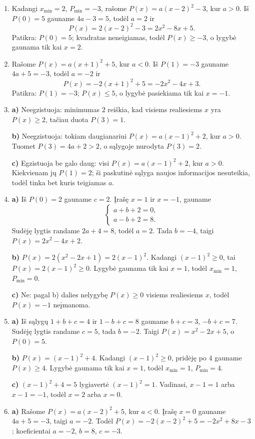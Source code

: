 \documentclass[12pt,a4paper]{article}
\begin{document}
\begin{enumerate}
\textbf{c)} Ne. Jei maksimumas yra $1$, kiekvienam $x$ turi galioti $P(x)\le1$, tačiau sąlyga $P(0)=2$ tam prieštarauja.
\item Kadangi $x_{\min}=2$, $P_{\min}=-3$, rašome $P(x)=a(x-2)^2-3$, kur $a>0$. Iš $P(0)=5$ gauname $4a-3=5$, todėl $a=2$ ir
\[
P(x)=2(x-2)^2-3=2x^2-8x+5.
\]
Patikra: $P(0)=5$; kvadratas neneigiamas, todėl $P(x)\ge-3$, o lygybė gaunama tik kai $x=2$.
\item Rašome $P(x)=a(x+1)^2+5$, kur $a<0$. Iš $P(1)=-3$ gauname $4a+5=-3$, todėl $a=-2$ ir
\[
P(x)=-2(x+1)^2+5=-2x^2-4x+3.
\]
Patikra: $P(1)=-3$; $P(x)\le5$, o lygybė pasiekiama tik kai $x=-1$.
\item \textbf{a)} Neegzistuoja: minimumas $2$ reiškia, kad visiems realiesiems $x$ yra $P(x)\ge2$, tačiau duota $P(3)=1$.

\textbf{b)} Neegzistuoja: tokiam daugianariui $P(x)=a(x-1)^2+2$, kur $a>0$. Tuomet $P(3)=4a+2>2$, o sąlygoje nurodyta $P(3)=2$.

\textbf{c)} Egzistuoja be galo daug: visi $P(x)=a(x-1)^2+2$, kur $a>0$. Kiekvienam jų $P(1)=2$; ši paskutinė sąlyga naujos informacijos nesuteikia, todėl tinka bet kuris teigiamas $a$.
\item \textbf{a)} Iš $P(0)=2$ gauname $c=2$. Įrašę $x=1$ ir $x=-1$, gauname
\[
\begin{cases}a+b+2=0,\\a-b+2=8.\end{cases}
\]
Sudėję lygtis randame $2a+4=8$, todėl $a=2$. Tada $b=-4$, taigi $P(x)=2x^2-4x+2$.

\textbf{b)} $P(x)=2(x^2-2x+1)=2(x-1)^2$. Kadangi $(x-1)^2\ge0$, tai $P(x)=2(x-1)^2\ge0$. Lygybė gaunama tik kai $x=1$, todėl $x_{\min}=1$, $P_{\min}=0$.

\textbf{c)} Ne: pagal b) dalies nelygybę $P(x)\ge0$ visiems realiesiems $x$, todėl $P(x)=-1$ neįmanoma.
\item \textbf{a)} Iš sąlygų $1+b+c=4$ ir $1-b+c=8$ gauname $b+c=3$, $-b+c=7$. Sudėję lygtis randame $c=5$, tada $b=-2$. Taigi $P(x)=x^2-2x+5$, o $P(0)=5$.

\textbf{b)} $P(x)=(x-1)^2+4$. Kadangi $(x-1)^2\ge0$, pridėję po $4$ gauname $P(x)\ge4$. Lygybė gaunama tik kai $x=1$, todėl $x_{\min}=1$, $P_{\min}=4$.

\textbf{c)} $(x-1)^2+4=5$ lygiavertė $(x-1)^2=1$. Vadinasi, $x-1=1$ arba $x-1=-1$, todėl $x=2$ arba $x=0$.
\item \textbf{a)} Rašome $P(x)=a(x-2)^2+5$, kur $a<0$. Įrašę $x=0$ gauname $4a+5=-3$, taigi $a=-2$. Todėl $P(x)=-2(x-2)^2+5=-2x^2+8x-3$; koeficientai $a=-2$, $b=8$, $c=-3$.


\end{enumerate}
\end{document}
